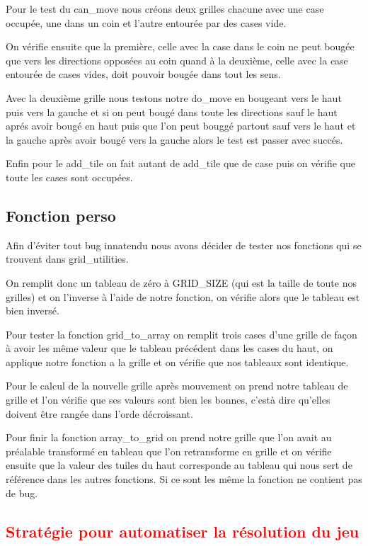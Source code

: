 \documentclass{article}
\begin{document}
  Pour le test du can\_move nous créons deux grilles chacune avec une case occupée, une dans un coin et l'autre entourée par des cases vide.

  On vérifie ensuite que la première, celle avec la case dans le coin ne peut bougée que vers les directions opposées au coin quand à la deuxième, celle avec la case entourée de cases vides, doit pouvoir bougée dans tout les sens.
  
  Avec la deuxième grille nous testons notre do\_move en bougeant vers le haut puis vers la gauche et si on peut bougé dans toute les directions sauf le haut aprés avoir bougé en haut puis que l'on peut bouggé partout sauf vers le haut et la gauche après avoir bougé vers la gauche alors le test est passer avec succés.

  Enfin pour le add\_tile on fait autant de add\_tile que de case puis on vérifie que toute les cases sont occupées.
  
  \subsection{Fonction perso}
  
  Afin d'éviter tout bug innatendu nous avons décider de tester nos fonctions qui se trouvent dans grid\_utilities.

  On remplit donc un tableau de zéro à GRID\_SIZE (qui est la taille de toute nos grilles) et on l'inverse à l'aide de notre fonction, on vérifie alors que le tableau est bien inversé.

  Pour tester la fonction grid\_to\_array on remplit trois cases d'une grille de façon à avoir les même valeur que le tableau précédent dans les cases du haut, on applique notre fonction a la grille et on vérifie que nos tableaux sont identique.

  Pour le calcul de la nouvelle grille après mouvement on prend notre tableau de grille et l'on vérifie que ses valeurs sont bien les bonnes, c'està dire qu'elles doivent être rangée dans l'orde décroissant.

  Pour finir la fonction array\_to\_grid on prend notre grille que l'on avait au préalable transformé en tableau que l'on retransforme en grille et on vérifie ensuite que la valeur des tuiles du haut corresponde au tableau qui nous sert de référence dans les autres fonctions. Si ce sont les même la fonction ne contient pas de bug.
  
  \textcolor{red}{\section{Stratégie pour automatiser la résolution du jeu}}
\end{document}
